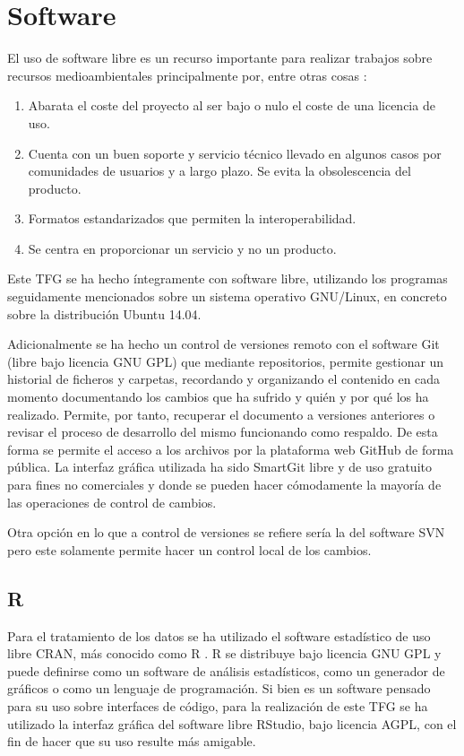 \section{Software} \label{sec:software}
El uso de software libre es un recurso importante para realizar trabajos sobre recursos medioambientales principalmente por, entre otras cosas \citep{MatellanOliveira2004}:

\begin{enumerate}
	\item Abarata el coste del proyecto al ser bajo o nulo el coste de una licencia de uso.
	\item Cuenta con un buen soporte y servicio técnico llevado en algunos casos por comunidades de usuarios y a largo plazo. Se evita la obsolescencia del producto.
	\item Formatos estandarizados que permiten la interoperabilidad.
	\item Se centra en proporcionar un servicio y no un producto.
\end{enumerate}

Este \ac{TFG} se ha hecho íntegramente con software libre, utilizando los programas seguidamente mencionados sobre un sistema operativo GNU/Linux, en concreto sobre la distribución Ubuntu 14.04.\Sep

Adicionalmente se ha hecho un control de versiones remoto con el software Git (libre bajo licencia GNU GPL) que mediante repositorios, permite gestionar un historial de ficheros y carpetas, recordando y organizando el contenido en cada momento documentando los cambios que ha sufrido y quién y por qué los ha realizado. Permite, por tanto, recuperar el documento a versiones anteriores o revisar el proceso de desarrollo del mismo funcionando como respaldo. De esta forma se permite el acceso a los archivos por la plataforma web GitHub de forma pública. La interfaz gráfica utilizada ha sido SmartGit \citep{GmbH2015} libre y de uso gratuito para fines no comerciales y donde se pueden hacer cómodamente la mayoría de las operaciones de control de cambios.\Sep

Otra opción en lo que a control de versiones se refiere sería la del software \ac{SVN} \citep{Latex2011} pero este solamente permite hacer un control local de los cambios.

\subsection{R}
Para el tratamiento de los datos se ha utilizado el software estadístico de uso libre CRAN, más conocido como R \citep{R2013}. R se distribuye bajo licencia GNU GPL y puede definirse como un software de análisis estadísticos, como un generador de gráficos o como un lenguaje de programación. Si bien es un software pensado para su uso sobre interfaces de código, para la realización de este \ac{TFG} se ha utilizado la interfaz gráfica del software libre RStudio, bajo licencia AGPL, con el fin de hacer que su uso resulte más amigable.\Sep

